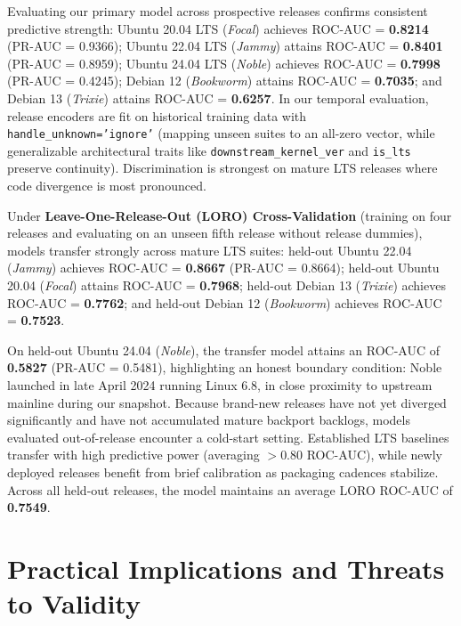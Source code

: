 \documentclass[graybox]{svmult}
\begin{document}
Evaluating our primary model across prospective releases confirms consistent predictive strength: Ubuntu 20.04 LTS (\textit{Focal}) achieves ROC-AUC = \textbf{0.8214} (PR-AUC = 0.9366); Ubuntu 22.04 LTS (\textit{Jammy}) attains ROC-AUC = \textbf{0.8401} (PR-AUC = 0.8959); Ubuntu 24.04 LTS (\textit{Noble}) achieves ROC-AUC = \textbf{0.7998} (PR-AUC = 0.4245); Debian 12 (\textit{Bookworm}) attains ROC-AUC = \textbf{0.7035}; and Debian 13 (\textit{Trixie}) attains ROC-AUC = \textbf{0.6257}. In our temporal evaluation, release encoders are fit on historical training data with \texttt{handle\_unknown='ignore'} (mapping unseen suites to an all-zero vector, while generalizable architectural traits like \texttt{downstream\_kernel\_ver} and \texttt{is\_lts} preserve continuity). Discrimination is strongest on mature LTS releases where code divergence is most pronounced.

Under \textbf{Leave-One-Release-Out (LORO) Cross-Validation} (training on four releases and evaluating on an unseen fifth release without release dummies), models transfer strongly across mature LTS suites: held-out Ubuntu 22.04 (\textit{Jammy}) achieves ROC-AUC = \textbf{0.8667} (PR-AUC = 0.8664); held-out Ubuntu 20.04 (\textit{Focal}) attains ROC-AUC = \textbf{0.7968}; held-out Debian 13 (\textit{Trixie}) achieves ROC-AUC = \textbf{0.7762}; and held-out Debian 12 (\textit{Bookworm}) achieves ROC-AUC = \textbf{0.7523}.

On held-out Ubuntu 24.04 (\textit{Noble}), the transfer model attains an ROC-AUC of \textbf{0.5827} (PR-AUC = 0.5481), highlighting an honest boundary condition: Noble launched in late April 2024 running Linux 6.8, in close proximity to upstream mainline during our snapshot. Because brand-new releases have not yet diverged significantly and have not accumulated mature backport backlogs, models evaluated out-of-release encounter a cold-start setting. Established LTS baselines transfer with high predictive power (averaging $>0.80$ ROC-AUC), while newly deployed releases benefit from brief calibration as packaging cadences stabilize. Across all held-out releases, the model maintains an average LORO ROC-AUC of \textbf{0.7549}.

\section{Practical Implications and Threats to Validity}
\label{sec:guidelines}
\end{document}

